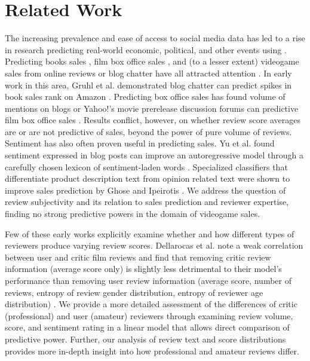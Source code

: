 \documentclass[letterpaper]{article}
\begin{document}
\section{Related Work}
The increasing prevalence and ease of access to social media data has led to a rise in research predicting real-world economic, political, and other events using \cite{asur2010predicting}. Predicting books sales \cite{gruhl2005predictive}, film box office sales \cite{dellarocas2007exploring}\cite{yu2012mining}, and (to a lesser extent) videogame sales from online reviews or blog chatter have all attracted attention \cite{ehrenfeld2011predicting}\cite{marcoux2009hybrid}. In early work in this area, Gruhl et al. demonstrated blog chatter can predict spikes in book sales rank on Amazon \cite{gruhl2005predictive}. 
Predicting box office sales has found volume of mentions on blogs or Yahoo!'s movie prerelease discussion forums can predictive film box office sales \cite{liu2001word}\cite{duan2008online}. Results conflict, however, on whether review score averages are \cite{dellarocas2007exploring} or are not \cite{liu2001word}\cite{duan2008online} predictive of sales, beyond the power of pure volume of reviews.
Sentiment has also often proven useful in predicting sales. Yu et al. found sentiment expressed in blog posts can improve an autoregressive model through a carefully chosen lexicon of sentiment-laden words \cite{yu2012mining}. Specialized classifiers that differentiate product description text from opinion related text were shown to improve sales prediction by Ghose and Ipeirotis \cite{ghose2007designing}. 
We address the question of review subjectivity and its relation to sales prediction and reviewer expertise, finding no strong predictive powers in the domain of videogame sales.

Few of these early works explicitly examine whether and how different types of reviewers produce varying review scores. Dellarocas et al. note a weak correlation between user and critic film reviews and find that removing critic review information (average score only) is slightly less detrimental to their model's performance than removing user review information (average score, number of reviews, entropy of review gender distribution, entropy of reviewer age distribution) \cite{dellarocas2007exploring}. We provide a more detailed assessment of the differences of critic (professional) and user (amateur) reviewers through examining review volume, score, and sentiment rating in a linear model that allows direct comparison of predictive power. Further, our analysis of review text and score distributions provides more in-depth insight into how professional and amateur reviews differ.
\end{document}
